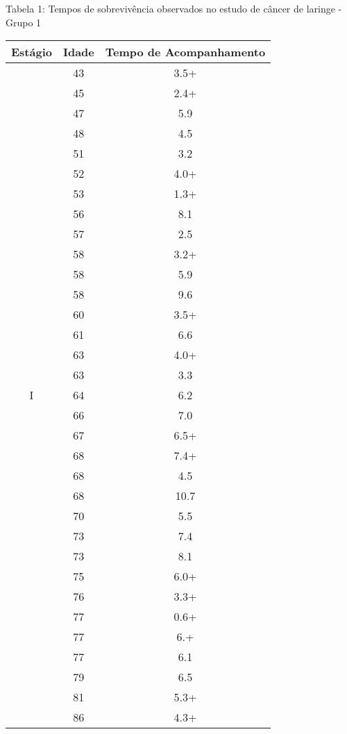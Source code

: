 \documentclass[12pt,a4paper]{article}
\begin{document}
	\begin{center}
		\small{Tabela 1: Tempos de sobrevivência observados no estudo de câncer de laringe  - Grupo 1}
		\begin{tabular}{|c|c|c|}\hline
			\textbf{Estágio} & \textbf{Idade} & \textbf{Tempo de Acompanhamento}\\ \hline
			\multirow{33}{*}{I} & 43 & 3.5+\\ \cline{2-3}
			& 45 & 2.4+\\ \cline{2-3}
			& 47  & 5.9\\ \cline{2-3}
			& 48  & 4.5\\ \cline{2-3}
			& 51  & 3.2\\ \cline{2-3}
			& 52 & 4.0+\\ \cline{2-3}
			& 53 & 1.3+\\ \cline{2-3}
			& 56  & 8.1\\ \cline{2-3}
			& 57  & 2.5\\ \cline{2-3}
			& 58 & 3.2+\\ \cline{2-3}
			& 58  & 5.9\\ \cline{2-3}
			& 58  & 9.6\\ \cline{2-3}
			& 60 & 3.5+\\ \cline{2-3}
			& 61  & 6.6\\ \cline{2-3}
			& 63 & 4.0+\\ \cline{2-3}
			& 63  & 3.3\\ \cline{2-3}
			& 64  & 6.2\\ \cline{2-3}
			& 66  & 7.0\\ \cline{2-3}
			& 67 & 6.5+\\ \cline{2-3}
			& 68 & 7.4+\\ \cline{2-3}
			& 68  & 4.5\\ \cline{2-3}
			& 68  & 10.7\\ \cline{2-3}
			& 70  & 5.5\\ \cline{2-3}
			& 73  & 7.4\\ \cline{2-3}
			& 73  & 8.1\\ \cline{2-3}
			& 75 & 6.0+\\ \cline{2-3}
			& 76 & 3.3+\\ \cline{2-3}
			& 77 & 0.6+\\ \cline{2-3}
			& 77 & 6.+\\ \cline{2-3}
			& 77  & 6.1\\ \cline{2-3}
			& 79  & 6.5\\ \cline{2-3}
			& 81 & 5.3+\\ \cline{2-3}
			& 86 & 4.3+\\ \hline

\end{tabular}
\end{center}
\end{document}
